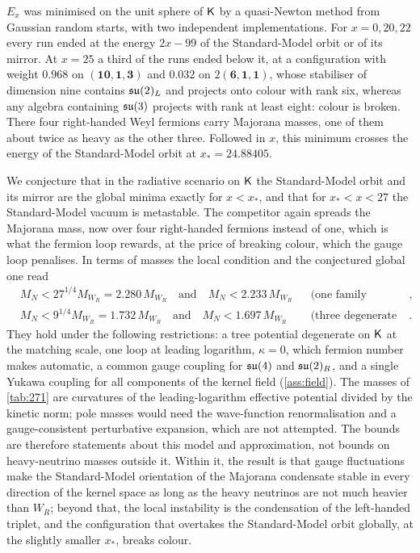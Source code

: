 \begin{proposition}
\label{prop:randomstart}
$E_x$ was minimised on the unit sphere of $\mathsf K$ by a quasi-Newton method from Gaussian random starts, with two independent implementations. For $x=0,20,22$ every run
ended at the energy $2x-99$ of the Standard-Model orbit or of its mirror. At $x=25$ a third of the runs ended below it, at a configuration with weight $0.968$ on
$(\mathbf{10},\mathbf1,\mathbf3)$ and $0.032$ on $2(\mathbf6,\mathbf1,\mathbf1)$, whose stabiliser of dimension nine contains $\mathfrak{su}(2)_L$ and projects onto colour with rank six, whereas any
algebra containing $\mathfrak{su}(3)$ projects with rank at least eight: colour is broken. There four right-handed Weyl fermions carry Majorana masses, one of them about twice as heavy
as the other three. Followed in $x$, this minimum crosses the energy of the Standard-Model orbit at $x_*=24.88405$.
\end{proposition}

We conjecture that in the radiative scenario on $\mathsf K$ the Standard-Model orbit and its mirror are the global minima exactly for $x<x_*$, and that for $x_*<x<27$ the
Standard-Model vacuum is metastable. The competitor again spreads the Majorana mass, now over four right-handed fermions instead of one, which is what the fermion loop
rewards, at the price of breaking colour, which the gauge loop penalises. In terms of masses the local condition and the conjectured global one read
\[
\begin{aligned}
&M_N<27^{1/4}M_{W_R}=2.280\,M_{W_R}\quad\text{and}\quad M_N<2.233\,M_{W_R}&&\text{(one family dominating)},\\
&M_N<9^{1/4}M_{W_R}=1.732\,M_{W_R}\quad\text{and}\quad M_N<1.697\,M_{W_R}&&\text{(three degenerate families)}.
\end{aligned}
\]
They hold under the following restrictions: a tree potential degenerate on $\mathsf K$ at the matching scale, one loop at leading logarithm, $\kappa=0$, which fermion number
makes automatic, a common gauge coupling for $\mathfrak{su}(4)$ and $\mathfrak{su}(2)_R$, and a single Yukawa coupling for all components of the kernel field (\cref{ass:field}). The masses of
\cref{tab:271} are curvatures of the leading-logarithm effective potential divided by the kinetic norm; pole masses would need the wave-function renormalisation and a
gauge-consistent perturbative expansion, which are not attempted. The bounds are therefore statements about this model and approximation, not bounds on heavy-neutrino
masses outside it. Within it, the result is that gauge fluctuations make the Standard-Model orientation of the
Majorana condensate stable in every direction of the kernel space as long as the heavy neutrinos are not much heavier than $W_R$; beyond that, the local instability is
the condensation of the left-handed triplet, and the configuration that overtakes the Standard-Model orbit globally, at the slightly smaller $x_*$, breaks colour.
